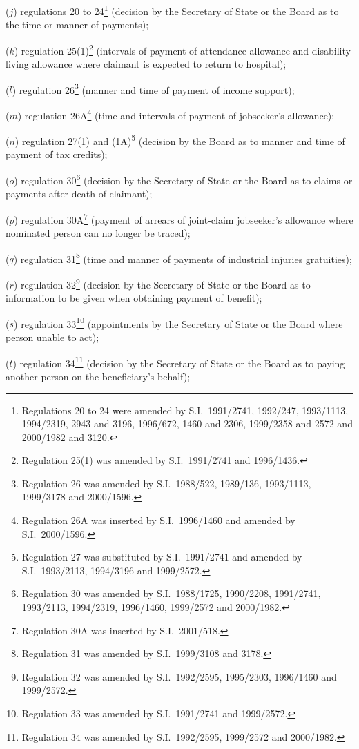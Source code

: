 \documentclass[12pt,a4paper]{article}
\begin{document}
\begin{enumerate}
($j$) regulations 20 to 24\footnote{Regulations 20 to 24 were amended by S.I.\ 1991/2741, 1992/247, 1993/1113, 1994/2319, 2943 and 3196, 1996/672, 1460 and 2306, 1999/2358 and 2572 and 2000/1982 and 3120.} (decision by the Secretary of State or the Board as to the time or manner of payments);

($k$) regulation 25(1)\footnote{Regulation 25(1) was amended by S.I.\ 1991/2741 and 1996/1436.} (intervals of payment of attendance allowance and disability living allowance where claimant is expected to return to hospital);

($l$) regulation 26\footnote{Regulation 26 was amended by S.I.\ 1988/522, 1989/136, 1993/1113, 1999/3178 and 2000/1596.} (manner and time of payment of income support);

($m$) regulation 26A\footnote{Regulation 26A was inserted by S.I.\ 1996/1460 and amended by S.I.\ 2000/1596.} (time and intervals of payment of jobseeker’s allowance);

($n$) regulation 27(1) and (1A)\footnote{Regulation 27 was substituted by S.I.\ 1991/2741 and amended by S.I.\ 1993/2113, 1994/3196 and 1999/2572.} (decision by the Board as to manner and time of payment of tax credits);

($o$) regulation 30\footnote{Regulation 30 was amended by S.I.\ 1988/1725, 1990/2208, 1991/2741, 1993/2113, 1994/2319, 1996/1460, 1999/2572 and 2000/1982.} (decision by the Secretary of State or the Board as to claims or payments after death of claimant);

($p$) regulation 30A\footnote{Regulation 30A was inserted by S.I.\ 2001/518.} (payment of arrears of joint-claim jobseeker’s allowance where nominated person can no longer be traced);

($q$) regulation 31\footnote{Regulation 31 was amended by S.I.\ 1999/3108 and 3178.} (time and manner of payments of industrial injuries gratuities);

($r$) regulation 32\footnote{Regulation 32 was amended by S.I.\ 1992/2595, 1995/2303, 1996/1460 and 1999/2572.} (decision by the Secretary of State or the Board as to information to be given when obtaining payment of benefit);

\pagebreak[3]

($s$) regulation 33\footnote{Regulation 33 was amended by S.I.\ 1991/2741 and 1999/2572.} (appointments by the Secretary of State or the Board where person unable to act);

($t$) regulation 34\footnote{Regulation 34 was amended by S.I.\ 1992/2595, 1999/2572 and 2000/1982.} (decision by the Secretary of State or the Board as to paying another person on the beneficiary’s behalf);


\end{enumerate}
\end{document}
